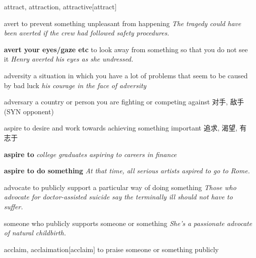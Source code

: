 \begin{DefWord}{attract, attraction, attractive}[attract]
\end{DefWord}

\begin{DefWord}{avert}
    to prevent something unpleasant from happening
    \textit{The tragedy could have been averted if the crew had followed safety procedures.}

    \textbf{avert your eyes/gaze etc} 
    to look away from something so that you do not see it
    \textit{Henry averted his eyes as she undressed.}

\end{DefWord}

\begin{DefWord}{adversity}
    a situation in which you have a lot of problems that seem to be caused by bad luck
    \textit{his courage in the face of adversity}
\end{DefWord}

\begin{DefWord}{adversary}
    a country or person you are fighting or competing against 对手, 敌手 (SYN opponent)
\end{DefWord}

\begin{DefWord}{aspire}
    to desire and work towards achieving something important
    追求, 渴望, 有志于

    \textbf{aspire to}
    \textit{college graduates aspiring to careers in finance}

    \textbf{aspire to do something}
    \textit{At that time, all serious artists aspired to go to Rome.}
\end{DefWord}

\begin{DefWord}{advocate}
    to publicly support a particular way of doing something
    \textit{Those who advocate for doctor-assisted suicide say the terminally ill should not have to suffer.}

    someone who publicly supports someone or something
    \textit{She's a passionate advocate of natural childbirth.}
\end{DefWord}

\begin{DefWord}{acclaim, acclaimation}[acclaim]
    to praise someone or something publicly
\end{DefWord}